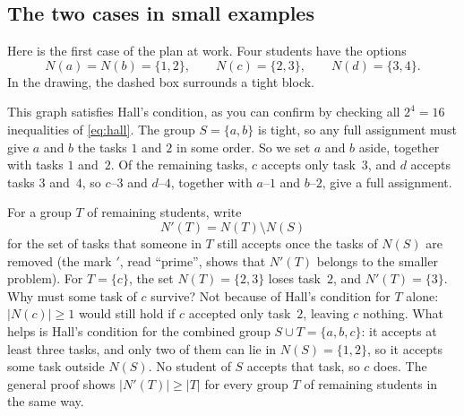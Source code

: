 \subsection*{The two cases in small examples}
Here is the first case of the plan at work. Four students have the options
\[
N(a)=N(b)=\{1,2\},\qquad N(c)=\{2,3\},\qquad N(d)=\{3,4\}.
\]
In the drawing, the dashed box surrounds a tight block.
\begin{center}
\end{center}
This graph satisfies Hall's condition, as you can confirm by checking all $2^4=16$ inequalities of \eqref{eq:hall}. The group $S=\{a,b\}$ is tight, so any full assignment must give $a$ and $b$ the tasks $1$ and $2$ in some order. So we set $a$ and $b$ aside, together with tasks $1$ and~$2$. Of the remaining tasks, $c$ accepts only task~$3$, and $d$ accepts tasks $3$ and~$4$, so $c$--$3$ and $d$--$4$, together with $a$--$1$ and $b$--$2$, give a full assignment.

For a group $T$ of remaining students, write
\[
N'(T)=N(T)\setminus N(S)
\]
for the set of tasks that someone in $T$ still accepts once the tasks of $N(S)$ are removed (the mark $'$, read ``prime'', shows that $N'(T)$ belongs to the smaller problem). For $T=\{c\}$, the set $N(T)=\{2,3\}$ loses task~$2$, and $N'(T)=\{3\}$. Why must some task of $c$ survive? Not because of Hall's condition for $T$ alone: $|N(c)|\ge1$ would still hold if $c$ accepted only task~$2$, leaving $c$ nothing. What helps is Hall's condition for the combined group $S\cup T=\{a,b,c\}$: it accepts at least three tasks, and only two of them can lie in $N(S)=\{1,2\}$, so it accepts some task outside $N(S)$. No student of $S$ accepts that task, so $c$ does. The general proof shows $|N'(T)|\ge|T|$ for every group $T$ of remaining students in the same way.

